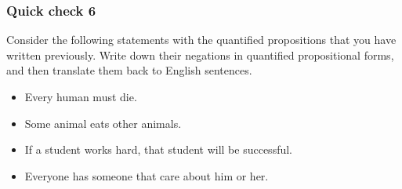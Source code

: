 \begin{frame}\frametitle{Quick check 6}
  Consider the following statements with the quantified propositions
  that you have written previously.  Write down their negations in
  quantified propositional forms, and then translate them back to
  English sentences.
  \begin{itemize}
  \item Every human must die.
  \item Some animal eats other animals.
  \item If a student works hard, that student will be successful.
  \item Everyone has someone that care about him or her.
  \end{itemize}                  
\end{frame}
